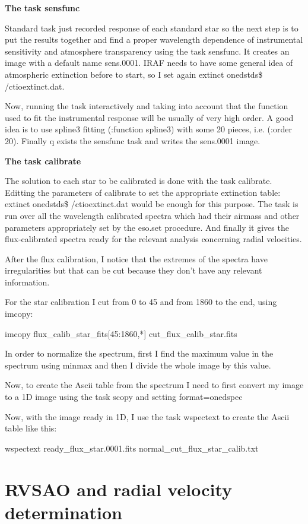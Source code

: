 \textbf{The task sensfunc}

Standard task just recorded response of each standard star so the next step is to put the results together and find a proper wavelength dependence of instrumental sensitivity and atmosphere transparency using the task sensfunc. It creates an image with a default name sens.0001. IRAF needs to have some general idea of atmospheric extinction before to start, so I set again extinct onedstds\$ /ctioextinct.dat.

Now, running the task interactively and taking into account that the function used to fit the instrumental response will be usually of very high order. A good idea is to use spline3 fitting (:function spline3) with some 20 pieces, i.e. (:order 20).
Finally q exists the sensfunc task and writes the sens.0001 image.

\textbf{The task calibrate}

The solution to each star to be calibrated is done with the task calibrate. Editting the parameters of calibrate to set the appropriate extinction table: extinct onedstds\$ /ctioextinct.dat would be enough for this purpose. The task is run over all the wavelength calibrated spectra which had their airmass and other parameters appropriately set by the eso.set procedure. And finally it gives the flux-calibrated spectra ready for the relevant analysis concerning radial velocities.

After the flux calibration, I notice that the extremes of the spectra have irregularities but that can be cut because they don't have any relevant information.

For the star calibration I cut from 0 to 45 and from 1860 to the end, using imcopy:

\begin{center}
imcopy flux\_calib\_star\_fits[45:1860,*] cut\_flux\_calib\_star.fits
\end{center}

In order to normalize the spectrum, first I find the maximum value in the spectrum using minmax and then I divide the whole image by this value.

Now, to create the Ascii table from the spectrum I need to first convert my image to a 1D image using the task scopy and setting format=onedspec

Now, with the image ready in 1D, I use the task wspectext to create the Ascii table like this:

\begin{center}
wspectext ready\_flux\_star.0001.fits normal\_cut\_flux\_star\_calib.txt
\end{center}

\section{RVSAO and radial velocity determination}